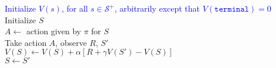 \documentclass{standalone}
\begin{document}
\pagestyle{empty}
\begin{algorithm}[H]
  \KwInput{The policy $\pi$ to be evaluated; step size $\alpha \in (0, 1]$}
  \textcolor{blue}{Initialize $V(s)$, for all $s \in \mathcal S^+$, arbitrarily except that   $V(\texttt{terminal}) = 0$}\\
 {
  Initialize $S$ \\
   {
    $A \gets $ action given by $\pi$ for $S$ \\
    Take action $A$, observe $R$, $S'$ \\
    $V(S) \gets V(S) + \alpha \left[ R + \gamma V(S') - V(S) \right]$ \\
    $S \gets S'$
  }
}
\end{algorithm}
\end{document}
